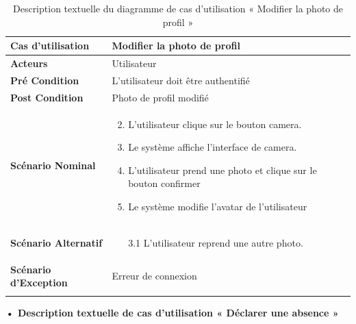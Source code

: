 \begin{longtable}{|p{5cm}|p{10cm}|}
\hline
\textbf{Cas d'utilisation}&Modifier la photo de profil   \\
\hline
\textbf{Acteurs}&Utilisateur\\
\hline
\textbf{Pré Condition}&L'utilisateur doit être authentifié\\
\hline
\textbf{Post Condition}&Photo de profil modifié \\
\hline
\textbf{Scénario Nominal}&
\vspace{-\baselineskip}
\begin{enumerate}
  \setcounter{enumi}{1}
  \item L'utilisateur clique sur le bouton camera.
  \item Le système affiche l'interface de camera.
  \item L'utilisateur prend une photo et clique sur le bouton confirmer 
  \item Le système modifie l'avatar de l'utilisateur
\end{enumerate}\\
\hline
\textbf{Scénario Alternatif}&
\vspace{-\baselineskip}
\begin{enumerate}
 \item [3.1] L'utilisateur reprend une autre photo.
\end{enumerate}\\
\hline
\textbf{Scénario d'Exception}&
Erreur de connexion\\
\hline
\caption{Description textuelle du diagramme de cas d'utilisation « Modifier la photo de profil   »}
\label{tab:use_case_modify_profile_picture}
\end{longtable}

\textbf{•	Description textuelle de cas d'utilisation « Déclarer une absence   »}

